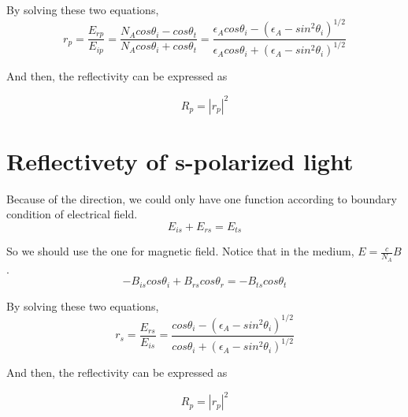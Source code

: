 \documentclass{article}
\begin{document}
		By solving these two equations, 
		\begin{equation}
			r_{p} = \frac{E_{rp}}{E_{ip}} = \frac{N_{A}cos\theta_{i} - cos\theta_{t}}{N_{A}cos\theta_{i} + cos\theta_{t}} = \frac{\epsilon_{A}cos\theta_{i} - (\epsilon_{A} - sin^{2}\theta_{i})^{1/2}}{\epsilon_{A}cos\theta_{i} + (\epsilon_{A} - sin^{2}\theta_{i})^{1/2}}
		\end{equation}

		And then, the reflectivity can be expressed as 

		\begin{equation}
			R_{p} = |r_{p}|^{2}
		\end{equation}

	\section{Reflectivety of s-polarized light}

		Because of the direction, we could only have one function according to boundary condition of electrical field.
		\begin{equation}
			E_{is} + E_{rs} = E_{ts}
		\end{equation}

		So we should use the one for magnetic field. Notice that in the medium, $E = \frac{c}{N_{A}}B$.
		\begin{equation}
			-B_{is}cos\theta_{i} + B_{rs}cos\theta_{r} = -B_{ts}cos\theta_{t}
		\end{equation}

		By solving these two equations, 
		\begin{equation}
			r_{s} = \frac{E_{rs}}{E_{is}} = \frac{cos\theta_{i} - (\epsilon_{A} - sin^{2}\theta_{i})^{1/2}}{cos\theta_{i} + (\epsilon_{A} - sin^{2}\theta_{i})^{1/2}}
		\end{equation}		

		And then, the reflectivity can be expressed as 

		\begin{equation}
			R_{p} = |r_{p}|^{2}
		\end{equation}
\end{document}

